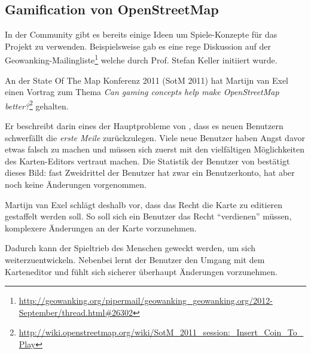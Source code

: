 \subsection{Gamification von OpenStreetMap}
In der  Community gibt es bereits einige Ideen um Spiele-Konzepte für das Projekt zu verwenden.
Beispielsweise gab es eine rege Diskussion auf der Geowanking-Mailingliste\footnote{\url{http://geowanking.org/pipermail/geowanking_geowanking.org/2012-September/thread.html\#26302}} welche durch Prof. Stefan Keller initiiert wurde.

An der State Of The Map Konferenz 2011 (SotM 2011) hat Martijn van Exel  einen Vortrag zum Thema \emph{Can gaming concepts help make OpenStreetMap better?}\footnote{\url{http://wiki.openstreetmap.org/wiki/SotM_2011_session:_Insert_Coin_To_Play}} gehalten.

Er beschreibt darin eines der Hauptprobleme von , dass es neuen Benutzern schwerfällt die \emph{erste Meile} zurückzulegen.
Viele neue Benutzer haben Angst davor etwas falsch zu machen und müssen sich zuerst mit den vielfältigen Möglichkeiten des Karten-Editors vertraut machen.
Die Statistik der Benutzer von  bestätigt dieses Bild: fast Zweidrittel der Benutzer hat zwar ein Benutzerkonto, hat aber noch keine Änderungen vorgenommen.

Martijn van Exel schlägt deshalb vor, dass das Recht die Karte zu editieren gestaffelt werden soll.
So soll sich ein Benutzer das Recht "`verdienen"' müssen, komplexere Änderungen an der Karte vorzunehmen.

Dadurch kann der Spieltrieb des Menschen geweckt werden, um sich weiterzuentwickeln.
Nebenbei lernt der Benutzer den Umgang mit dem Karteneditor und fühlt sich sicherer überhaupt Änderungen vorzunehmen.